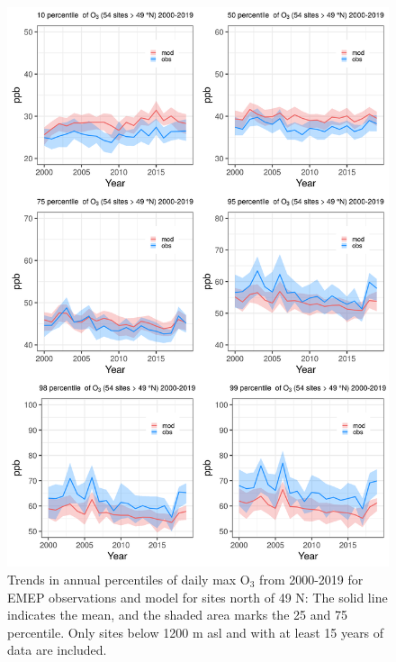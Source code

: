 \begin{figure}[h]
	\centering
	\includegraphics[width=0.74\paperwidth]{FIGS_TRENDS/alltrends_north_49_2000_2019_1200m.png}
	\caption{\label{fig:O3_perctrends_N}Trends in annual percentiles of daily max O$_3$ from 2000-2019 for EMEP observations and model for sites north of 49 N: The solid line indicates the mean, and the shaded area marks the 25 and 75 percentile. Only sites below 1200 m asl and with at least 15 years of data are included.}
\end{figure}

